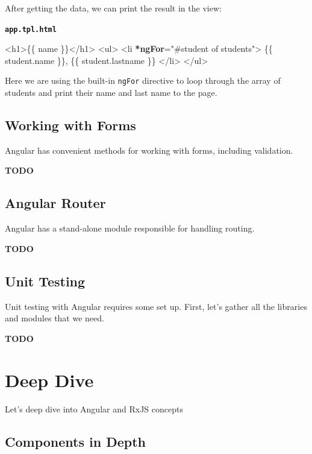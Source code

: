 \documentclass[12pt,]{article}
\newenvironment{Shaded}{}{}
\newcommand{\KeywordTok}[1]{\textcolor[rgb]{0.00,0.00,1.00}{{#1}}}
\newcommand{\StringTok}[1]{\textcolor[rgb]{0.00,0.50,0.50}{{#1}}}
\newcommand{\OtherTok}[1]{\textcolor[rgb]{1.00,0.25,0.00}{{#1}}}
\newcommand{\ErrorTok}[1]{\textcolor[rgb]{1.00,0.00,0.00}{\textbf{{#1}}}}
\newcommand{\NormalTok}[1]{{#1}}
\begin{document}
After getting the data, we can print the result in the view:

\textbf{\texttt{app.tpl.html}}

\begin{Shaded}
\begin{Highlighting}[numbers=left,,]
\KeywordTok{<h1>}\NormalTok{\{\{ name \}\}}\KeywordTok{</h1>}
\KeywordTok{<ul>}
  \KeywordTok{<li} \ErrorTok{*ngFor}\OtherTok{=}\StringTok{"#student of students"}\KeywordTok{>}
    \NormalTok{\{\{ student.name \}\}, \{\{ student.lastname \}\}}
  \KeywordTok{</li>}
\KeywordTok{</ul>}
\end{Highlighting}
\end{Shaded}

Here we are using the built-in \texttt{ngFor} directive to loop through
the array of students and print their name and last name to the page.

\subsection{Working with Forms}\label{working-with-forms}

Angular has convenient methods for working with forms, including
validation.

\textbf{TODO}

\subsection{Angular Router}\label{angular-router}

Angular has a stand-alone module responsible for handling routing.

\textbf{TODO}

\subsection{Unit Testing}\label{unit-testing}

Unit testing with Angular requires some set up. First, let's gather all
the libraries and modules that we need.

\textbf{TODO}

\section{Deep Dive}\label{deep-dive}

Let's deep dive into Angular and RxJS concepts

\subsection{Components in Depth}\label{components-in-depth}
\end{document}
